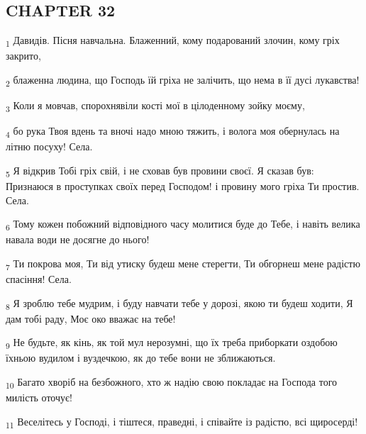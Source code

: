 \subsection{CHAPTER 32}
\begin{tcolorbox}
\textsubscript{1} Давидів. Пісня навчальна. Блаженний, кому подарований злочин, кому гріх закрито,
\end{tcolorbox}
\begin{tcolorbox}
\textsubscript{2} блаженна людина, що Господь їй гріха не залічить, що нема в її дусі лукавства!
\end{tcolorbox}
\begin{tcolorbox}
\textsubscript{3} Коли я мовчав, спорохнявіли кості мої в цілоденному зойку моєму,
\end{tcolorbox}
\begin{tcolorbox}
\textsubscript{4} бо рука Твоя вдень та вночі надо мною тяжить, і волога моя обернулась на літню посуху! Села.
\end{tcolorbox}
\begin{tcolorbox}
\textsubscript{5} Я відкрив Тобі гріх свій, і не сховав був провини своєї. Я сказав був: Признаюся в проступках своїх перед Господом! і провину мого гріха Ти простив. Села.
\end{tcolorbox}
\begin{tcolorbox}
\textsubscript{6} Тому кожен побожний відповідного часу молитися буде до Тебе, і навіть велика навала води не досягне до нього!
\end{tcolorbox}
\begin{tcolorbox}
\textsubscript{7} Ти покрова моя, Ти від утиску будеш мене стерегти, Ти обгорнеш мене радістю спасіння! Села.
\end{tcolorbox}
\begin{tcolorbox}
\textsubscript{8} Я зроблю тебе мудрим, і буду навчати тебе у дорозі, якою ти будеш ходити, Я дам тобі раду, Моє око вважає на тебе!
\end{tcolorbox}
\begin{tcolorbox}
\textsubscript{9} Не будьте, як кінь, як той мул нерозумні, що їх треба приборкати оздобою їхньою вудилом і вуздечкою, як до тебе вони не зближаються.
\end{tcolorbox}
\begin{tcolorbox}
\textsubscript{10} Багато хворіб на безбожного, хто ж надію свою покладає на Господа того милість оточує!
\end{tcolorbox}
\begin{tcolorbox}
\textsubscript{11} Веселітесь у Господі, і тіштеся, праведні, і співайте із радістю, всі щиросерді!
\end{tcolorbox}
